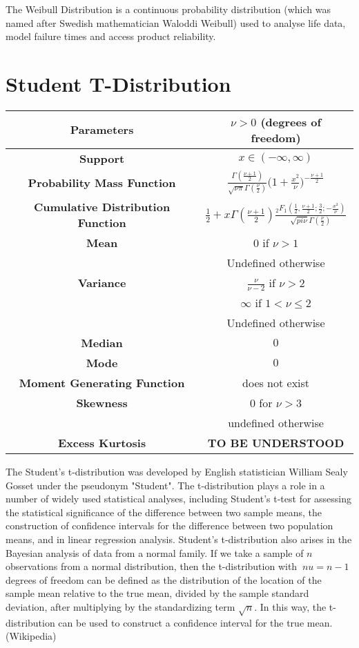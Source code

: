 \documentclass[14pt, a4paper]{article}
\theoremstyle{definition}
\begin{document}
The Weibull Distribution is a continuous probability distribution (which was named after Swedish mathematician Waloddi Weibull) used to analyse life data, model failure times and access product reliability. 

\section{Student T-Distribution}

\begin{tabular}{|c|c|}  %
\hline
 \textbf{Parameters }& $\nu > 0$ (degrees of freedom) \\
 \hline
 \textbf{Support} & $x \in (- \infty,\infty)$ \\
 \hline
 \textbf{Probability Mass Function} & $\frac{\Gamma (\frac{\nu +1}{2})}{\sqrt{\nu \pi} \Gamma(\frac{\nu}{2})} \Big( 1+ \frac{x^2}{\nu} \Big) ^{- \frac{\nu+1}{2}}$ \\
 \hline
 \textbf{Cumulative Distribution Function} & $\frac{1}{2} + x \Gamma(\frac{\nu+1}{2} ) \frac{_2F_1 (\frac{1}{2} , \frac{\nu + 1}{2} ; \frac{3}{2} ; - \frac{x^2}{\nu} )}{\sqrt{pi \nu } \Gamma(\frac{\nu}{2} )}$  \\
 \hline
 \textbf{Mean} & $0$ if $\nu > 1$ \\ & Undefined otherwise\\ 
 \hline
 \textbf{Variance} & $\frac{\nu}{\nu - 2}$ if $\nu > 2$ \\ & $\infty$ if $1 < \nu \leq 2$ \\ & Undefined otherwise \\
 \hline
 \textbf{Median} &  $0$\\ 
 \hline
 \textbf{Mode} & $0$\\
 \hline
 \textbf{Moment Generating Function} & does not exist \\
 \hline
 \textbf{Skewness} & $0 $ for $ \nu > 3 $ \\ & undefined otherwise \\
 \hline
 \textbf{Excess Kurtosis} & \textbf{TO BE UNDERSTOOD} \\
 \hline
       
  \end{tabular}

The Student's t-distribution was developed by English statistician William Sealy Gosset under the pseudonym "Student". The t-distribution plays a role in a number of widely used statistical analyses, including Student's t-test for assessing the statistical significance of the difference between two sample means, the construction of confidence intervals for the difference between two population means, and in linear regression analysis. Student's t-distribution also arises in the Bayesian analysis of data from a normal family. If we take a sample of $n$ observations from a normal distribution, then the t-distribution with $ \ nu =n-1$ degrees of freedom can be defined as the distribution of the location of the sample mean relative to the true mean, divided by the sample standard deviation, after multiplying by the standardizing term $\sqrt {n}$. In this way, the t-distribution can be used to construct a confidence interval for the true mean.(Wikipedia)
\end{document}
